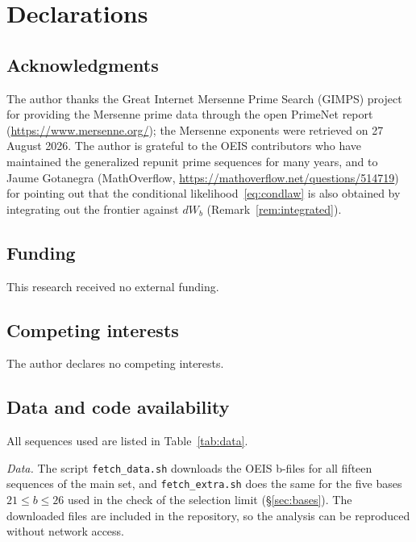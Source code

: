 \documentclass[11pt,a4paper]{article}
\theoremstyle{plain}
\theoremstyle{remark}
\begin{document}
\section*{Declarations}

\subsection*{Acknowledgments}
The author thanks the Great Internet Mersenne Prime Search (GIMPS) project for
providing the Mersenne prime data through the open PrimeNet report
(\url{https://www.mersenne.org/}); the Mersenne exponents were retrieved on
27 August 2026. The author is grateful to the OEIS contributors who have
maintained the generalized repunit prime sequences for many years, and to Jaume
Gotanegra (MathOverflow, \url{https://mathoverflow.net/questions/514719}) for
pointing out that the conditional likelihood~\eqref{eq:condlaw} is also obtained
by integrating out the frontier against $dW_b$ (Remark~\ref{rem:integrated}).

\subsection*{Funding}
This research received no external funding.

\subsection*{Competing interests}
The author declares no competing interests.

\subsection*{Data and code availability}
All sequences used are listed in Table~\ref{tab:data}.

\emph{Data.} The script \texttt{fetch\_data.sh} downloads the OEIS b-files for
all fifteen sequences of the main set, and \texttt{fetch\_extra.sh} does the
same for the five bases $21\le b\le26$ used in the check of the selection limit
(\S\ref{sec:bases}). The downloaded files are included in the repository, so the
analysis can be reproduced without network access.
\end{document}
